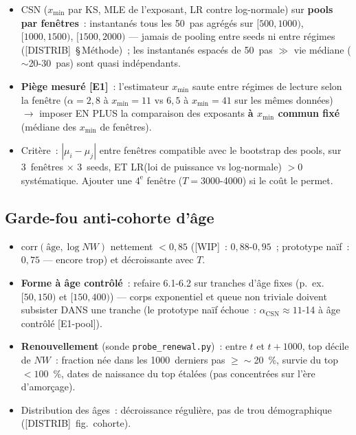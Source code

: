 \documentclass[11pt,a4paper]{article}
\newcommand{\NW}{\mathit{NW}}
\begin{document}
\begin{itemize}
  \item CSN ($x_{\min}$ par KS, MLE de l'exposant, LR contre log-normale) sur \textbf{pools par fenêtres}~: instantanés tous les 50~pas agrégés sur $[500,1000)$, $[1000,1500)$, $[1500,2000)$ --- jamais de pooling entre seeds ni entre régimes ([DISTRIB]~\S\,Méthode)~; les instantanés espacés de 50~pas $\gg$ vie médiane ($\sim$20-30~pas) sont quasi indépendants.
  \item \textbf{Piège mesuré [E1]}~: l'estimateur $x_{\min}$ saute entre régimes de lecture selon la fenêtre ($\alpha=2{,}8$ à $x_{\min}=11$ vs $6{,}5$ à $x_{\min}=41$ sur les mêmes données) $\to$ imposer EN PLUS la comparaison des exposants \textbf{à $x_{\min}$ commun fixé} (médiane des $x_{\min}$ de fenêtres).
  \item Critère~: $|\mu_i-\mu_j|$ entre fenêtres compatible avec le bootstrap des pools, sur 3~fenêtres $\times$ 3~seeds, ET LR(loi de puissance vs log-normale) $>0$ systématique. Ajouter une $4^{\text{e}}$ fenêtre ($T=3000$-4000) si le coût le permet.
\end{itemize}

\subsection{Garde-fou anti-cohorte d'âge}
\label{sec:garde-fou-cohorte}

\begin{itemize}
  \item $\mathrm{corr}(\text{âge},\log\NW)$ nettement $<0{,}85$ ([WIP]~: $0{,}88$-$0{,}95$~; prototype naïf~: $0{,}75$ --- encore trop) et décroissante avec $T$.
  \item \textbf{Forme à âge contrôlé}~: refaire 6.1-6.2 sur tranches d'âge fixes (p.~ex.\ $[50,150)$ et $[150,400)$) --- corps exponentiel et queue non triviale doivent subsister DANS une tranche (le prototype naïf échoue~: $\alpha_{\mathrm{CSN}}\approx 11$-14 à âge contrôlé [E1-pool]).
  \item \textbf{Renouvellement} (sonde \texttt{probe_renewal.py})~: entre $t$ et $t+1000$, top décile de $\NW$~: fraction née dans les 1000~derniers pas $\geq \sim$20~\%, survie du top $<100$~\%, dates de naissance du top étalées (pas concentrées sur l'ère d'amorçage).
  \item Distribution des âges~: décroissance régulière, pas de trou démographique ([DISTRIB]~fig.~cohorte).
\end{itemize}
\end{document}
